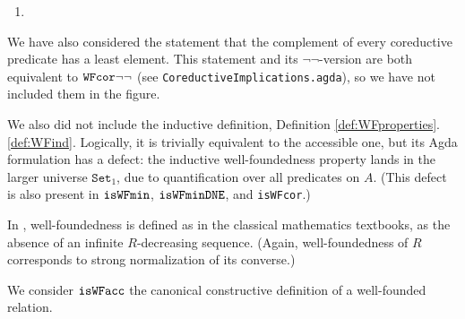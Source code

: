 \begin{enumerate}
  \item {}

\end{enumerate}

We have also considered the statement that the complement of every coreductive predicate
  has a least element.  This statement and its $\lnot\lnot$-version are both equivalent to $\mathtt{WFcor}{\lnot\lnot}$
  (see \texttt{CoreductiveImplications.agda}), so we have not included them in the figure.  

We also did not include the inductive definition, Definition \ref{def:WFproperties}.\ref{def:WFind}.
  Logically, it is trivially equivalent to the accessible one, but its Agda formulation has a defect: 
  the inductive well-foundedness property lands in the larger universe $\mathtt{Set}_1$, due to 
  quantification over all predicates on $A$.  (This defect is also present in $\mathtt{isWFmin}$, $\mathtt{isWFminDNE}$, and \texttt{isWFcor}.)

In \cite{Terese}, well-foundedness is defined as in the classical mathematics textbooks,
as the absence of an infinite $R$-decreasing sequence.
(Again, well-foundedness of $R$ corresponds to strong normalization of its converse.)

We consider $\mathtt{isWFacc}$ the canonical constructive definition of a well-founded relation.


